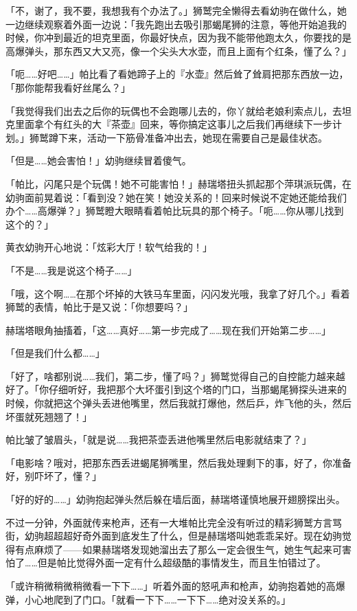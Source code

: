 「不，谢了，我不要，我想我有个办法了。」狮鹫完全懒得去看幼驹在做什么，她一边继续观察着外面一边说：「我先跑出去吸引那蝎尾狮的注意，等他开始追我的时候，你冲到最近的坦克里面，你最好快点，因为我不能带他跑太久，你要找的是高爆弹头，那东西又大又亮，像一个尖头大水壶，而且上面有个红条，懂了么？」

「呃……好吧……」帕比看了看她蹄子上的『水壶』然后耸了耸肩把那东西放一边，「那你能帮我看好丝尾么？」

「我觉得我们出去之后你的玩偶也不会跑哪儿去的，你丫就给老娘利索点儿，去坦克里面拿个有红头的大『茶壶』回来，等你搞定这事儿之后我们再继续下一步计划。」狮鹫蹲下来，活动一下筋骨准备冲出去，她现在需要自己是最佳状态。

「但是……她会害怕！」幼驹继续冒着傻气。

「帕比，闪尾只是个玩偶！她不可能害怕！」赫瑞塔扭头抓起那个萍琪派玩偶，在幼驹面前晃着说：「看到没？她在笑！她没关系的！回来时候说不定她还能给我们办个……高爆弹？」狮鹫瞪大眼睛看着帕比玩具的那个椅子。「呃……你从哪儿找到这个的？」

黄衣幼驹开心地说：「炫彩大厅！软气给我的！」

「不是……我是说这个椅子……」

「哦，这个啊……在那个坏掉的大铁马车里面，闪闪发光哦，我拿了好几个。」看着狮鹫的表情，帕比于是又说：「你想要吗？」

赫瑞塔眼角抽搐着，「这……真好……第一步完成了……现在我们开始第二步……」

「但是我们什么都……」

「好了，啥都别说……我们，第二步，懂了吗？」狮鹫觉得自己的自控能力越来越好了。「你仔细听好，我把那个大坏蛋引到这个塔的门口，当那蝎尾狮探头进来的时候，你就把这个弹头丢进他嘴里，然后我就打爆他，然后乒，炸飞他的头，然后坏蛋就死翘翘了！」

帕比皱了皱眉头，「就是说……我把茶壶丢进他嘴里然后电影就结束了？」

「电影啥？哦对，把那东西丢进蝎尾狮嘴里，然后我处理剩下的事，好了，你准备好，别吓坏了，懂？」

「好的好的……」幼驹抱起弹头然后躲在墙后面，赫瑞塔谨慎地展开翅膀探出头。

不过一分钟，外面就传来枪声，还有一大堆帕比完全没有听过的精彩狮鹫方言骂街，幼驹超超超好奇外面到底发生了什么，但是赫瑞塔叫她乖乖呆好。现在幼驹觉得有点麻烦了——如果赫瑞塔发现她溜出去了那么一定会很生气，她生气起来可害怕了……但是帕比觉得外面一定有什么超级酷的事情发生，而且生怕错过了。

「或许稍微稍微稍微看一下下……」听着外面的怒吼声和枪声，幼驹抱着她的高爆弹，小心地爬到了门口。「就看一下下……一下下……绝对没关系的。」

